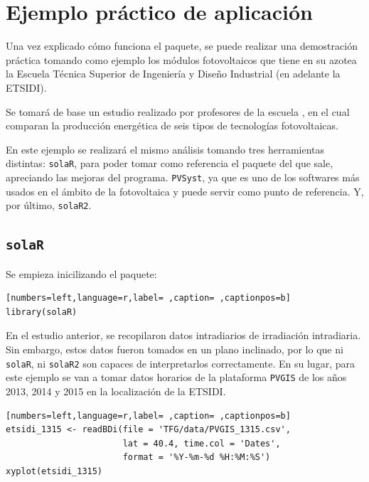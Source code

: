 \chapter{Ejemplo práctico de aplicación}
\label{chap:ejemplo-practico-aplicacion}
Una vez explicado cómo funciona el paquete, se puede realizar una demostración práctica tomando como ejemplo los módulos fotovoltaicos que tiene en su azotea la Escuela Técnica Superior de Ingeniería y Diseño Industrial (en adelante la ETSIDI).

Se tomará de base un estudio realizado por profesores de la escuela \cite{adrada17}, en el cual comparan la producción energética de seis tipos de tecnologías fotovoltaicas.

En este ejemplo se realizará el mismo análisis tomando tres herramientas distintas: \texttt{solaR}, para poder tomar como referencia el paquete del que sale, apreciando las mejoras del programa. \texttt{PVSyst}, ya que es uno de los softwares más usados en el ámbito de la fotovoltaica y puede servir como punto de referencia. Y, por último, \texttt{solaR2}.

\section{\texttt{solaR}}
\label{sec:org8e38186}
\label{sec:solaR}
Se empieza inicilizando el paquete:
\begin{lstlisting}[numbers=left,language=r,label= ,caption= ,captionpos=b]
library(solaR)
\end{lstlisting}

En el estudio anterior, se recopilaron datos intradiarios de irradiación intradiaria. Sin embargo, estos datos fueron tomados en un plano inclinado, por lo que ni \texttt{solaR}, ni \texttt{solaR2} son capaces de interpretarlos correctamente. En su lugar, para este ejemplo se van a tomar datos horarios de la plataforma \texttt{PVGIS} \cite{pvgis} de los años 2013, 2014 y 2015 en la localización de la ETSIDI.
\begin{lstlisting}[numbers=left,language=r,label= ,caption= ,captionpos=b]
etsidi_1315 <- readBDi(file = 'TFG/data/PVGIS_1315.csv',
                       lat = 40.4, time.col = 'Dates',
                       format = '%Y-%m-%d %H:%M:%S')
xyplot(etsidi_1315)
\end{lstlisting}

